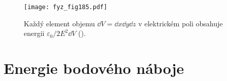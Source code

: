   \begin{figure}[ht!]  %
    \centering
    \texttt{[image: fyz\_fig185.pdf]}
    \caption{Každý element objemu \(\dd{V} = \dd{x}\dd{y}\dd{z}\) v elektrickém  poli obsahuje 
    energii \(\varepsilon_0/2E^2\dd{V}\) 
             (\cite[s.~154]{Feynman02}).}
    \label{fyz:fig185}
  \end{figure}
  
\section{Energie bodového náboje}\label{fyz:IIchapVIsecVI}


